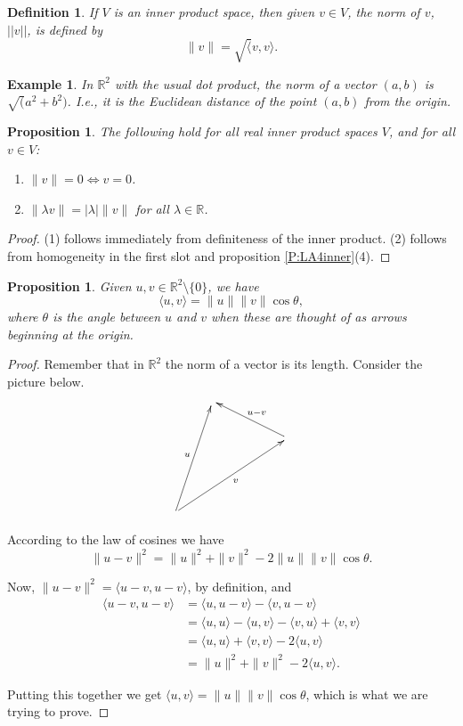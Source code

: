 \documentclass{article}
\theoremstyle{plain}
\newtheorem{proposition}[theorem]{Proposition}{\bfseries}{\itshape}
\newtheorem{definition}[theorem]{Definition}{\bfseries}{\upshape}
\newtheorem{example}[theorem]{Example}{\bfseries}{\upshape}
\newcommand{\bR}{\mathbb{R}}
\begin{document}
\begin{definition}
If $V$ is an inner product space, then given $v\in V$, the \emph{norm} of $v$, $||v||$, is defined by
\[\|v\| = \sqrt \langle v, v \rangle.\]
\end{definition} 

\begin{example}
In $\bR^2$ with the usual dot product, the norm of a vector $(a,b)$ is $\sqrt (a^2 + b^2)$. I.e., it is the Euclidean distance of the point $(a,b)$ from the origin.
\end{example}

\begin{proposition}
The following hold for all real inner product spaces $V$, and for all $v\in V$:
\begin{enumerate}
\item $\|v\| = 0 \iff v = 0$.
\item $\|\lambda v\| = |\lambda|\|v\|$ for all $\lambda\in \bR$.
\end{enumerate}
\end{proposition}
\begin{proof}
(1) follows immediately from definiteness of the inner product. (2) follows from homogeneity in the first slot and proposition \ref{P:LA4inner}(4).
\end{proof}

\begin{proposition}\label{P:LA4cos}
Given $u,v\in \bR^2\setminus\{0\}$, we have
\[\langle u, v\rangle = \|u\|\|v\|\cos \theta,\]
where $\theta$ is the angle between $u$ and $v$ when these are thought of as arrows beginning at the origin.
\end{proposition}
\begin{proof}
Remember that in $\bR^2$ the norm of a vector is its length. Consider the picture below.
\[\xymatrix{ &\\
& & &\ar[ull]_{u-v} \\
\\
\ar[uuur]^u\ar[uurrr]_v
}\] 

According to the law of cosines we have 
\[\|u-v\|^2 = \|u\|^2+\|v\|^2 - 2\|u\|\|v\|\cos \theta.\] 

Now, $\|u-v\|^2 = \langle u-v, u-v\rangle$, by definition, and
\begin{align*}\langle u-v, u-v\rangle &= \langle u, u-v\rangle - \langle v, u - v \rangle\\
&= \langle u, u \rangle -\langle u , v \rangle - \langle v , u \rangle + \langle v, v \rangle\\
&= \langle u, u \rangle + \langle v, v \rangle - 2\langle u, v \rangle\\
&= \|u\|^2+\|v\|^2 - 2\langle u, v \rangle .\end{align*}

Putting this together we get $\langle u, v \rangle = \|u\|\|v\|\cos \theta$, which is what we are trying to prove. 
\end{proof}
\end{document}
